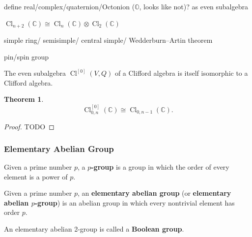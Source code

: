 \documentclass[12pt, letterpaper]{article}
\newcommand{\co}{\mathbb{C}}
\newcommand{\Cl}{\operatorname{Cl}}
\newcommand{\red}[1]{{\color{red} #1}}
\newtheorem{thm}[prop]{Theorem}
\theoremstyle{definition}
\theoremstyle{remark}
\theoremstyle{definition}
\theoremstyle{plain}
\numberwithin{equation}{section}
\begin{document}
	\red{define real/complex/quaternion/Octonion ($\mathbb{O}$, looks like not)? as even subalgebra}
	
	
	\red{$\Cl_{n+2}(\co)\cong\Cl_n(\co)\otimes\Cl_2(\co)$}
	
	\red{simple ring/ semisimple/ central simple/ Wedderburn--Artin theorem
	}
	
	\red{pin/spin group}

	\red{The even subalgebra $\Cl^{[0]}(V, Q)$ of a Clifford algebra is itself isomorphic to a Clifford algebra.}
	
	\begin{thm}\label{thmEvenCliffAlgComCong}
		\[\Cl_{0,n}^{[0]}(\co)\cong \Cl_{0,n-1}(\co).\]
	\end{thm}
	\begin{proof}
		\red{TODO}
	\end{proof}
	
	
	
	
	\subsubsection{Elementary Abelian Group}
	\begin{def*}[p-group]
		Given a prime number $p$, a \textbf{$p$-group} is a group in which the order of every element is a power of $p$.
	\end{def*}
	\begin{def*}
		Given a prime number $p$, an \textbf{elementary abelian group} (or \textbf{elementary abelian $p$-group})
		is an abelian group in which every nontrivial element has order $p$.
	\end{def*}
	\begin{def*}
		An elementary abelian 2-group is called a \textbf{Boolean group}.
	\end{def*}
\end{document}
